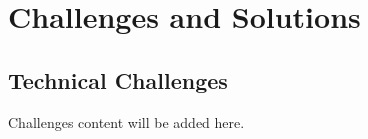 \chapter{Challenges and Solutions}
\section{Technical Challenges}
Challenges content will be added here.
